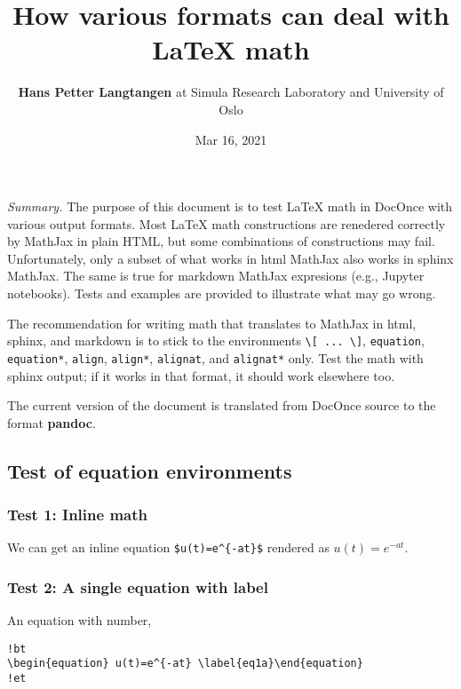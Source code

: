 \documentclass[]{article}
\title{How various formats can deal with LaTeX math}
\author{\textbf{Hans Petter Langtangen} at Simula Research Laboratory and
University of Oslo}
\date{Mar 16, 2021}
\begin{document}
\maketitle

\emph{Summary.} The purpose of this document is to test LaTeX math in
DocOnce with various output formats. Most LaTeX math constructions are
renedered correctly by MathJax in plain HTML, but some combinations of
constructions may fail. Unfortunately, only a subset of what works in
html MathJax also works in sphinx MathJax. The same is true for markdown
MathJax expresions (e.g., Jupyter notebooks). Tests and examples are
provided to illustrate what may go wrong.

The recommendation for writing math that translates to MathJax in html,
sphinx, and markdown is to stick to the environments
\texttt{\textbackslash{}{[}\ ...\ \textbackslash{}{]}},
\texttt{equation}, \texttt{equation*}, \texttt{align}, \texttt{align*},
\texttt{alignat}, and \texttt{alignat*} only. Test the math with sphinx
output; if it works in that format, it should work elsewhere too.

The current version of the document is translated from DocOnce source to
the format \textbf{pandoc}.

\subsection{Test of equation
environments}\label{test-of-equation-environments}

\subsubsection{Test 1: Inline math}\label{test-1-inline-math}

We can get an inline equation \texttt{\$u(t)=e\^{}\{-at\}\$} rendered as
\(u(t)=e^{-at}\).

\subsubsection{Test 2: A single equation with
label}\label{test-2-a-single-equation-with-label}

An equation with number,

\begin{verbatim}
!bt
\begin{equation} u(t)=e^{-at} \label{eq1a}\end{equation}
!et
\end{verbatim}
\end{document}
